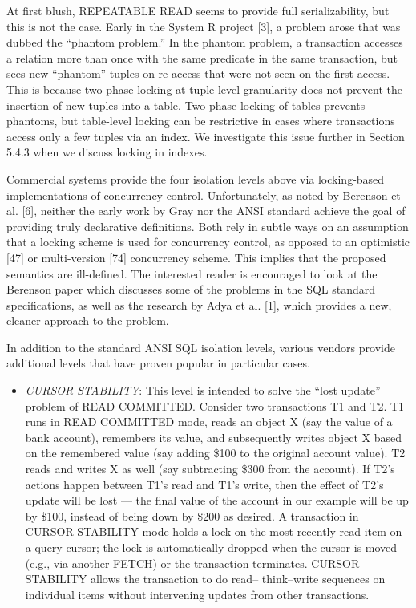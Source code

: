 \documentclass[a4paper,11pt,twoside,openright]{book}
\begin{document}
At first blush, REPEATABLE READ seems to provide full serializability,
but this is not the case. Early in the System R project {[}3{]}, a
problem arose that was dubbed the ``phantom problem.'' In the phantom
problem, a transaction accesses a relation more than once with the same
predicate in the same transaction, but sees new ``phantom'' tuples on
re-access that were not seen on the first access. This is because
two-phase locking at tuple-level granularity does not prevent the
insertion of new tuples into a table. Two-phase locking of tables
prevents phantoms, but table-level locking can be restrictive in cases
where transactions access only a few tuples via an index. We investigate
this issue further in Section 5.4.3 when we discuss locking in indexes.

Commercial systems provide the four isolation levels above via
locking-based implementations of concurrency control. Unfortunately, as
noted by Berenson et al. {[}6{]}, neither the early work by Gray nor the
ANSI standard achieve the goal of providing truly declarative
definitions. Both rely in subtle ways on an assumption that a locking
scheme is used for concurrency control, as opposed to an optimistic
{[}47{]} or multi-version {[}74{]} concurrency scheme. This implies that
the proposed semantics are ill-defined. The interested reader is
encouraged to look at the Berenson paper which discusses some of the
problems in the SQL standard specifications, as well as the research by
Adya et al. {[}1{]}, which provides a new, cleaner approach to the
problem.

In addition to the standard ANSI SQL isolation levels, various vendors
provide additional levels that have proven popular in particular cases.

\begin{itemize}

\item
  \emph{CURSOR STABILITY}: This level is intended to solve the ``lost
  update'' problem of READ COMMITTED. Consider two transactions T1 and
  T2. T1 runs in READ COMMITTED mode, reads an object X (say the value
  of a bank account), remembers its value, and subsequently writes
  object X based on the remembered value (say adding \$100 to the
  original account value). T2 reads and writes X as well (say
  subtracting \$300 from the account). If T2's actions happen between
  T1's read and T1's write, then the effect of T2's update will be lost
  --- the final value of the account in our example will be up by \$100,
  instead of being down by \$200 as desired. A transaction in CURSOR
  STABILITY mode holds a lock on the most recently read item on a query
  cursor; the lock is automatically dropped when the cursor is moved
  (e.g., via another FETCH) or the transaction terminates. CURSOR
  STABILITY allows the transaction to do read-- think--write sequences
  on individual items without intervening updates from other
  transactions.
\end{itemize}
\end{document}
